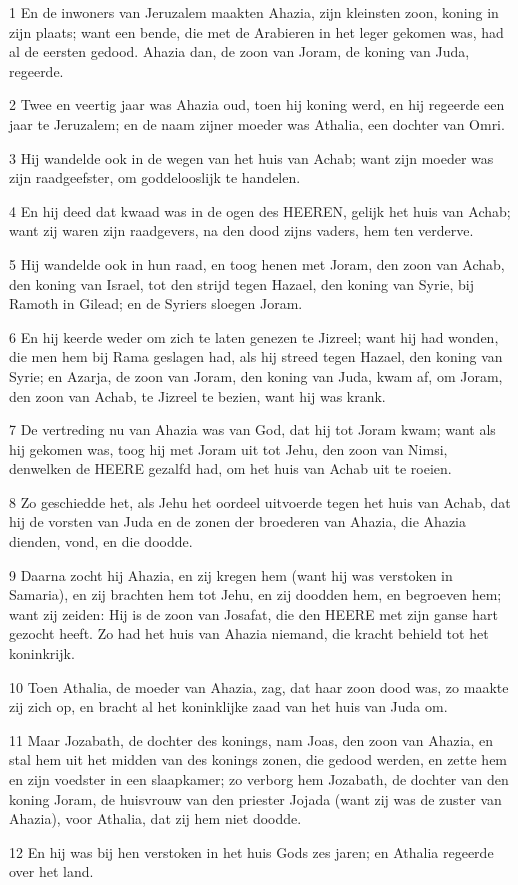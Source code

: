 \par 1 En de inwoners van Jeruzalem maakten Ahazia, zijn kleinsten zoon, koning in zijn plaats; want een bende, die met de Arabieren in het leger gekomen was, had al de eersten gedood. Ahazia dan, de zoon van Joram, de koning van Juda, regeerde.
\par 2 Twee en veertig jaar was Ahazia oud, toen hij koning werd, en hij regeerde een jaar te Jeruzalem; en de naam zijner moeder was Athalia, een dochter van Omri.
\par 3 Hij wandelde ook in de wegen van het huis van Achab; want zijn moeder was zijn raadgeefster, om goddelooslijk te handelen.
\par 4 En hij deed dat kwaad was in de ogen des HEEREN, gelijk het huis van Achab; want zij waren zijn raadgevers, na den dood zijns vaders, hem ten verderve.
\par 5 Hij wandelde ook in hun raad, en toog henen met Joram, den zoon van Achab, den koning van Israel, tot den strijd tegen Hazael, den koning van Syrie, bij Ramoth in Gilead; en de Syriers sloegen Joram.
\par 6 En hij keerde weder om zich te laten genezen te Jizreel; want hij had wonden, die men hem bij Rama geslagen had, als hij streed tegen Hazael, den koning van Syrie; en Azarja, de zoon van Joram, den koning van Juda, kwam af, om Joram, den zoon van Achab, te Jizreel te bezien, want hij was krank.
\par 7 De vertreding nu van Ahazia was van God, dat hij tot Joram kwam; want als hij gekomen was, toog hij met Joram uit tot Jehu, den zoon van Nimsi, denwelken de HEERE gezalfd had, om het huis van Achab uit te roeien.
\par 8 Zo geschiedde het, als Jehu het oordeel uitvoerde tegen het huis van Achab, dat hij de vorsten van Juda en de zonen der broederen van Ahazia, die Ahazia dienden, vond, en die doodde.
\par 9 Daarna zocht hij Ahazia, en zij kregen hem (want hij was verstoken in Samaria), en zij brachten hem tot Jehu, en zij doodden hem, en begroeven hem; want zij zeiden: Hij is de zoon van Josafat, die den HEERE met zijn ganse hart gezocht heeft. Zo had het huis van Ahazia niemand, die kracht behield tot het koninkrijk.
\par 10 Toen Athalia, de moeder van Ahazia, zag, dat haar zoon dood was, zo maakte zij zich op, en bracht al het koninklijke zaad van het huis van Juda om.
\par 11 Maar Jozabath, de dochter des konings, nam Joas, den zoon van Ahazia, en stal hem uit het midden van des konings zonen, die gedood werden, en zette hem en zijn voedster in een slaapkamer; zo verborg hem Jozabath, de dochter van den koning Joram, de huisvrouw van den priester Jojada (want zij was de zuster van Ahazia), voor Athalia, dat zij hem niet doodde.
\par 12 En hij was bij hen verstoken in het huis Gods zes jaren; en Athalia regeerde over het land.

